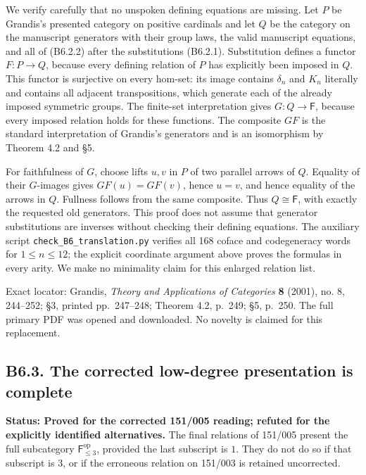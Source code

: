 We verify carefully that no unspoken defining equations are missing.
Let \(P\) be Grandis's presented category on positive cardinals and
let \(Q\) be the category on the manuscript generators with their group
laws, the valid manuscript equations, and all of (B6.2.2) after the
substitutions (B6.2.1).  Substitution defines a functor
\(F:P\to Q\), because every defining relation of \(P\) has explicitly
been imposed in \(Q\).  This functor is surjective on every hom-set:
its image contains \(\delta_n\) and \(K_n\) literally and contains all
adjacent transpositions, which generate each of the already imposed
symmetric groups.  The finite-set interpretation gives
\(G:Q\to\mathsf F\), because every imposed relation holds for these
functions.  The composite \(GF\) is the standard interpretation of
Grandis's generators and is an isomorphism by Theorem 4.2 and §5.

For faithfulness of \(G\), choose lifts \(u,v\) in \(P\) of two
parallel arrows of \(Q\).  Equality of their \(G\)-images gives
\(GF(u)=GF(v)\), hence \(u=v\), and hence equality of the arrows in
\(Q\).  Fullness follows from the same composite.  Thus
\(Q\cong\mathsf F\), with exactly the requested old generators.
This proof does not assume that generator substitutions are inverses
without checking their defining equations.  The auxiliary script
\texttt{check\_B6\_translation.py} verifies all 168 coface and
codegeneracy words for \(1\le n\le12\); the explicit coordinate
argument above proves the formulas in every arity.  We make no
minimality claim for this enlarged relation list.

Exact locator: Grandis, \emph{Theory and Applications of Categories}
\textbf{8} (2001), no. 8, 244--252; §3, printed pp.~247--248; Theorem
4.2, p.~249; §5, p.~250. The full primary PDF was opened and downloaded.
No novelty is claimed for this replacement.

\subsection{B6.3. The corrected low-degree presentation is
complete}\label{b6.3.-the-corrected-low-degree-presentation-is-complete}

\textbf{Status: Proved for the corrected 151/005 reading; refuted for
the explicitly identified alternatives.} The final relations of 151/005
present the full subcategory \(\mathsf F_{\le3}^{\mathrm{op}}\),
provided the last subscript is \(1\). They do not do so if that
subscript is \(3\), or if the erroneous relation on 151/003 is retained
uncorrected.

